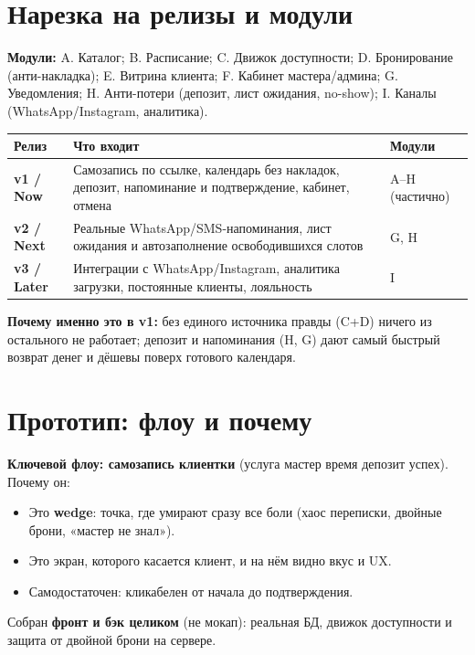 \documentclass[11pt,a4paper]{article}
\newcommand{\arr}{\textrightarrow{}}
\begin{document}
\section{Нарезка на релизы и модули}

\textbf{Модули:} A. Каталог; B. Расписание; C. Движок доступности; D. Бронирование (анти-накладка); E. Витрина клиента; F. Кабинет мастера/админа; G. Уведомления; H. Анти-потери (депозит, лист ожидания, no-show); I. Каналы (WhatsApp/Instagram, аналитика).

\renewcommand{\arraystretch}{1.3}
\begin{tabularx}{\textwidth}{|l|X|l|}
\hline
\textbf{Релиз} & \textbf{Что входит} & \textbf{Модули} \\
\hline
\textbf{v1 / Now} & Самозапись по ссылке, календарь без накладок, депозит, напоминание и подтверждение, кабинет, отмена & A--H (частично) \\
\hline
\textbf{v2 / Next} & Реальные WhatsApp/SMS-напоминания, лист ожидания и автозаполнение освободившихся слотов & G, H \\
\hline
\textbf{v3 / Later} & Интеграции с WhatsApp/Instagram, аналитика загрузки, постоянные клиенты, лояльность & I \\
\hline
\end{tabularx}

\textbf{Почему именно это в v1:} без единого источника правды (C+D) ничего из остального не работает; депозит и напоминания (H, G) дают самый быстрый возврат денег и дёшевы поверх готового календаря.

\section{Прототип: флоу и почему}

\textbf{Ключевой флоу: самозапись клиентки} (услуга \arr{} мастер \arr{} время \arr{} депозит \arr{} успех). Почему он:
\begin{itemize}
  \item Это \textbf{wedge}: точка, где умирают сразу все боли (хаос переписки, двойные брони, «мастер не знал»).
  \item Это экран, которого касается клиент, и на нём видно вкус и UX.
  \item Самодостаточен: кликабелен от начала до подтверждения.
\end{itemize}
Собран \textbf{фронт и бэк целиком} (не мокап): реальная БД, движок доступности и защита от двойной брони на сервере.
\end{document}
